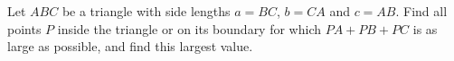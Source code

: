 Let $ABC$ be a triangle with side lengths $a=BC$, $b=CA$ and $c=AB$. Find all points $P$ inside the triangle or on its boundary for which $PA+PB+PC$ is as large as possible, and find this largest value.
